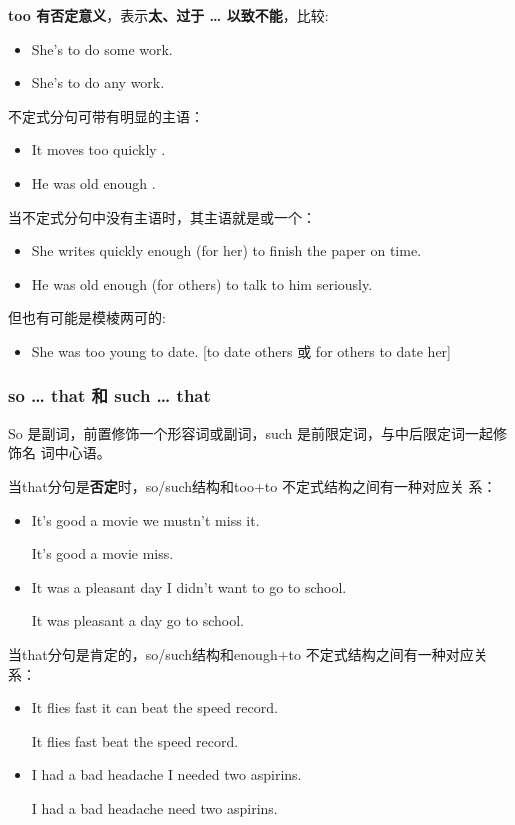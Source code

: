 \textbf{too 有否定意义}，表示\textbf{太、过于 \ldots{} 以致不能}，比较:
\begin{itemize}
\item She's  to do some work.
\item She's  to do any work.
\end{itemize}
不定式分句可带有明显的主语：
\begin{itemize}
\item It moves too quickly .
\item He was old enough .
\end{itemize}
当不定式分句中没有主语时，其主语就是或一个：
\begin{itemize}
\item She writes quickly enough (for her) to finish the paper on time.

\item He was old enough (for others) to talk to him seriously.
\end{itemize}
但也有可能是模棱两可的:
\begin{itemize}
\item She was too young to date. [to date others 或 for others to date her]
\end{itemize}

\subsubsection{so \ldots{} that 和 such \ldots{} that}

So 是副词，前置修饰一个形容词或副词，such 是前限定词，与中后限定词一起修饰名
词中心语。

当that分句是\textbf{否定}时，so/such结构和too+to 不定式结构之间有一种对应关
系：
\begin{itemize}
\item It's  good a movie  we mustn't miss it.

  It's  good a movie  miss.

\item It was  a pleasant day  I didn't want to go to school.

  It was  pleasant a day  go to school.
\end{itemize}

当that分句是肯定的，so/such结构和enough+to 不定式结构之间有一种对应关系：
\begin{itemize}
\item It flies  fast  it can beat the speed record.

  It flies fast  beat the speed record.

\item I had  a bad headache  I needed two aspirins.

  I had a bad  headache  need two aspirins.
\end{itemize}


